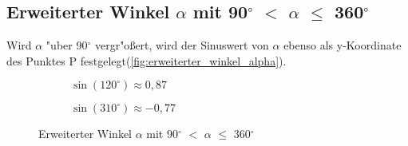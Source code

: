 \documentclass{standalone}
\begin{document}
\subsection{Erweiterter Winkel $\alpha$ mit 90$^\circ$  $<$ $\alpha$ $\leq$ 360$^\circ$ }

\noindent Wird $\alpha$ {"u}ber 90$^\circ$  vergr{"o}{\ss}ert, wird der Sinuswert von $\alpha$ ebenso als y-Koordinate des Punktes P festgelegt(\autoref{fig:erweiterter_winkel_alpha}).

\begin{figure}[h!]
  \centering
  \begin{subfigure}[b]{0.5\linewidth}
    \def\svgwidth{220px}
    
    \caption{$\sin(120^\circ ) \approx 0,87$}
    \label{fig:sin_120_087}
  \end{subfigure}
  \begin{subfigure}[b]{0.35\linewidth}
    \def\svgwidth{220px}
    
    \caption{$\sin(310^\circ ) \approx -0,77$}
    \label{fig:sin_310_-_077}
  \end{subfigure}
  \caption{Erweiterter Winkel $\alpha$ mit 90$^\circ$  $<$ $\alpha$ $\leq$ 360$^\circ$ }
  \label{fig:erweiterter_winkel_alpha}
\end{figure}
\end{document}
